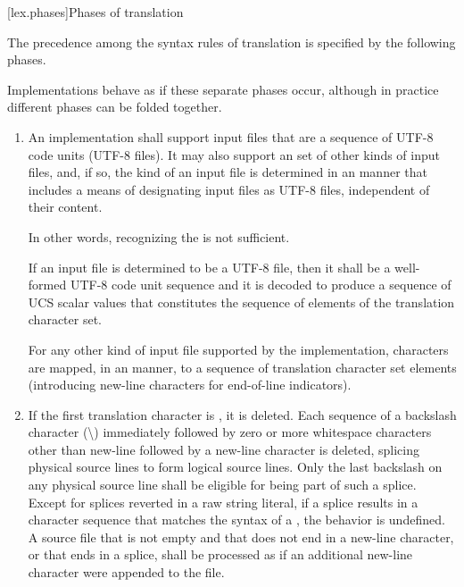 [lex.phases]{Phases of translation}%

\pnum
{}%
The precedence among the syntax rules of translation is specified by the
following phases.
\begin{footnote}
Implementations behave as if these separate phases
occur, although in practice different phases can be folded together.
\end{footnote}

\begin{enumerate}
\item
{}%
An implementation shall support input files
that are a sequence of UTF-8 code units (UTF-8 files).
It may also support
an  set of other kinds of input files, and,
if so, the kind of an input file is determined in
an  manner
that includes a means of designating input files as UTF-8 files,
independent of their content.
\begin{note}
In other words,
recognizing the  is not sufficient.
\end{note}
If an input file is determined to be a UTF-8 file,
then it shall be a well-formed UTF-8 code unit sequence and
it is decoded to produce a sequence of UCS scalar values
that constitutes the sequence of elements of the translation character set.

For any other kind of input file supported by the implementation,
characters are mapped, in an
 manner,
to a sequence of translation character set elements
(introducing new-line characters for end-of-line indicators).

\item
{}%
If the first translation character is ,
it is deleted.
Each sequence of a backslash character (\textbackslash)
immediately followed by
zero or more whitespace characters other than new-line followed by
a new-line character is deleted, splicing
physical source lines to form logical source lines. Only the last
backslash on any physical source line shall be eligible for being part
of such a splice.
Except for splices reverted in a raw string literal, if a splice results in
a character sequence that matches the
syntax of a , the behavior is
undefined. A source file that is not empty and that does not end in a new-line
character, or that ends in a splice,
shall be processed as if an additional new-line character were appended
to the file.


\end{enumerate}
